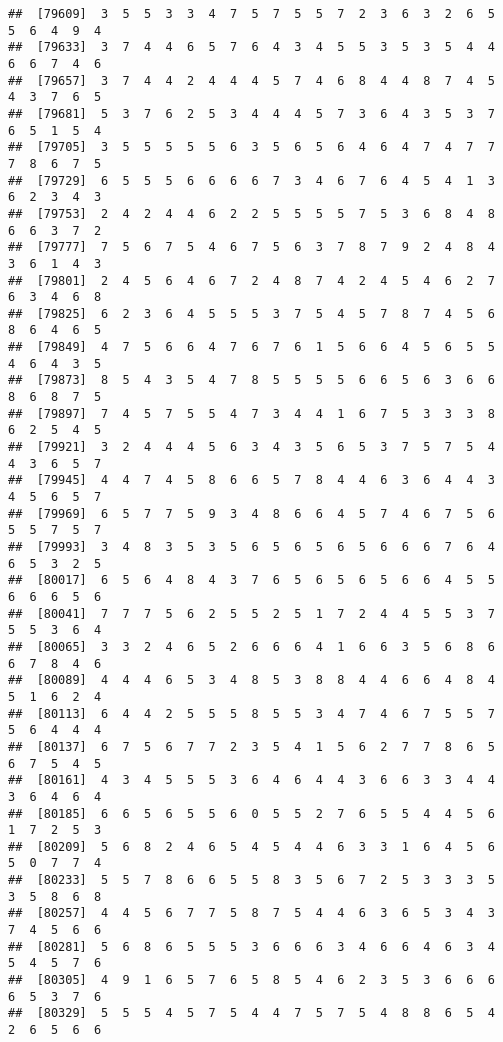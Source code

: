 \documentclass[
]{book}
\begin{document}
\begin{verbatim}
##  [79609]  3  5  5  3  3  4  7  5  7  5  5  7  2  3  6  3  2  6  5  5  6  4  9  4
##  [79633]  3  7  4  4  6  5  7  6  4  3  4  5  5  3  5  3  5  4  4  6  6  7  4  6
##  [79657]  3  7  4  4  2  4  4  4  5  7  4  6  8  4  4  8  7  4  5  4  3  7  6  5
##  [79681]  5  3  7  6  2  5  3  4  4  4  5  7  3  6  4  3  5  3  7  6  5  1  5  4
##  [79705]  3  5  5  5  5  5  6  3  5  6  5  6  4  6  4  7  4  7  7  7  8  6  7  5
##  [79729]  6  5  5  5  6  6  6  6  7  3  4  6  7  6  4  5  4  1  3  6  2  3  4  3
##  [79753]  2  4  2  4  4  6  2  2  5  5  5  5  7  5  3  6  8  4  8  6  6  3  7  2
##  [79777]  7  5  6  7  5  4  6  7  5  6  3  7  8  7  9  2  4  8  4  3  6  1  4  3
##  [79801]  2  4  5  6  4  6  7  2  4  8  7  4  2  4  5  4  6  2  7  6  3  4  6  8
##  [79825]  6  2  3  6  4  5  5  5  3  7  5  4  5  7  8  7  4  5  6  8  6  4  6  5
##  [79849]  4  7  5  6  6  4  7  6  7  6  1  5  6  6  4  5  6  5  5  4  6  4  3  5
##  [79873]  8  5  4  3  5  4  7  8  5  5  5  5  6  6  5  6  3  6  6  8  6  8  7  5
##  [79897]  7  4  5  7  5  5  4  7  3  4  4  1  6  7  5  3  3  3  8  6  2  5  4  5
##  [79921]  3  2  4  4  4  5  6  3  4  3  5  6  5  3  7  5  7  5  4  4  3  6  5  7
##  [79945]  4  4  7  4  5  8  6  6  5  7  8  4  4  6  3  6  4  4  3  4  5  6  5  7
##  [79969]  6  5  7  7  5  9  3  4  8  6  6  4  5  7  4  6  7  5  6  5  5  7  5  7
##  [79993]  3  4  8  3  5  3  5  6  5  6  5  6  5  6  6  6  7  6  4  6  5  3  2  5
##  [80017]  6  5  6  4  8  4  3  7  6  5  6  5  6  5  6  6  4  5  5  6  6  6  5  6
##  [80041]  7  7  7  5  6  2  5  5  2  5  1  7  2  4  4  5  5  3  7  5  5  3  6  4
##  [80065]  3  3  2  4  6  5  2  6  6  6  4  1  6  6  3  5  6  8  6  6  7  8  4  6
##  [80089]  4  4  4  6  5  3  4  8  5  3  8  8  4  4  6  6  4  8  4  5  1  6  2  4
##  [80113]  6  4  4  2  5  5  5  8  5  5  3  4  7  4  6  7  5  5  7  5  6  4  4  4
##  [80137]  6  7  5  6  7  7  2  3  5  4  1  5  6  2  7  7  8  6  5  6  7  5  4  5
##  [80161]  4  3  4  5  5  5  3  6  4  6  4  4  3  6  6  3  3  4  4  3  6  4  6  4
##  [80185]  6  6  5  6  5  5  6  0  5  5  2  7  6  5  5  4  4  5  6  1  7  2  5  3
##  [80209]  5  6  8  2  4  6  5  4  5  4  4  6  3  3  1  6  4  5  6  5  0  7  7  4
##  [80233]  5  5  7  8  6  6  5  5  8  3  5  6  7  2  5  3  3  3  5  3  5  8  6  8
##  [80257]  4  4  5  6  7  7  5  8  7  5  4  4  6  3  6  5  3  4  3  7  4  5  6  6
##  [80281]  5  6  8  6  5  5  5  3  6  6  6  3  4  6  6  4  6  3  4  5  4  5  7  6
##  [80305]  4  9  1  6  5  7  6  5  8  5  4  6  2  3  5  3  6  6  6  6  5  3  7  6
##  [80329]  5  5  5  4  5  7  5  4  4  7  5  7  5  4  8  8  6  5  4  2  6  5  6  6

\end{verbatim}
\end{document}
